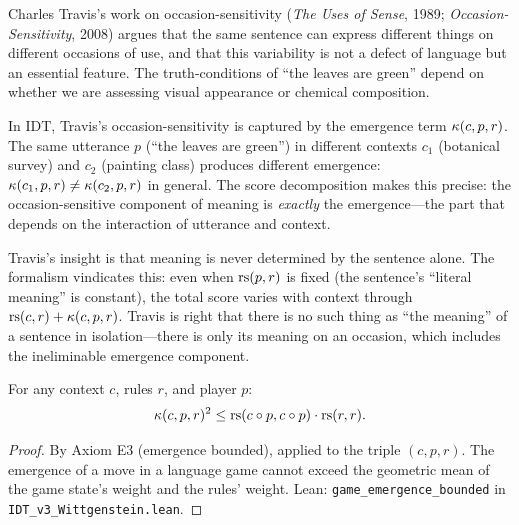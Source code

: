 \begin{interpretation}
Charles Travis's work on occasion-sensitivity (\textit{The Uses of Sense}, 1989;
\textit{Occasion-Sensitivity}, 2008) argues that the same sentence can express
different things on different occasions of use, and that this variability is not
a defect of language but an essential feature. The truth-conditions of ``the
leaves are green'' depend on whether we are assessing visual appearance or
chemical composition.

In IDT, Travis's occasion-sensitivity is captured by the emergence term
$\kappa(c, p, r)$. The same utterance $p$ (``the leaves are green'') in
different contexts $c_1$ (botanical survey) and $c_2$ (painting class) produces
different emergence: $\kappa(c_1, p, r) \neq \kappa(c_2, p, r)$ in general.
The score decomposition makes this precise: the occasion-sensitive component
of meaning is \emph{exactly} the emergence---the part that depends on the
interaction of utterance and context.

Travis's insight is that meaning is never determined by the sentence alone.
The formalism vindicates this: even when $\mathrm{rs}(p, r)$ is fixed (the sentence's
``literal meaning'' is constant), the total score varies with context through
$\mathrm{rs}(c, r) + \kappa(c, p, r)$. Travis is right that there is no such thing as
``the meaning'' of a sentence in isolation---there is only its meaning on an
occasion, which includes the ineliminable emergence component.
\end{interpretation}

\begin{theorem}
\label{thm:game-emergence-bounded}
For any context $c$, rules $r$, and player $p$:
\[
\kappa(c, p, r)^2 \leq \mathrm{rs}(c \circ p, c \circ p) \cdot \mathrm{rs}(r, r).
\]
\end{theorem}

\begin{proof}
By Axiom E3 (emergence bounded), applied to the triple $(c, p, r)$.
The emergence of a move in a language game cannot exceed the geometric
mean of the game state's weight and the rules' weight.
Lean: \texttt{game\_emergence\_bounded} in \texttt{IDT\_v3\_Wittgenstein.lean}.
\end{proof}

